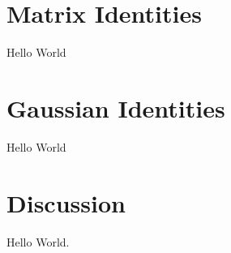 \documentclass[12pt]{article}
\begin{document}
\clearpage
\section{Matrix Identities}

Hello World

\clearpage
\section{Gaussian Identities}

Hello World

\clearpage
\section{Discussion}

Hello World.
\end{document}
